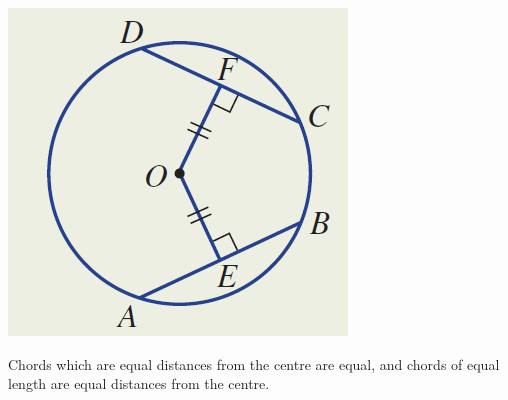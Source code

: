\documentclass{report}
\begin{document}
{\noindent\begin{minipage}{0.3\textwidth}%
    \includegraphics[width=\linewidth]{chordcentre.png}
\end{minipage}%
        \hfill%
\begin{minipage}{0.6\textwidth}\raggedright
        Chords which are equal distances from the centre are equal, and chords of equal length are equal distances from the centre.
\end{minipage}

}
\end{document}
